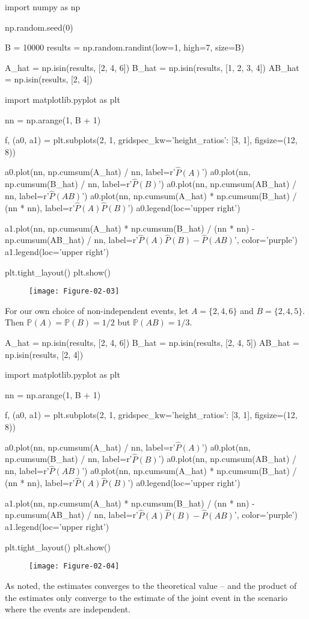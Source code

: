 \begin{python}
import numpy as np

np.random.seed(0)

B = 10000
results = np.random.randint(low=1, high=7, size=B)

A_hat = np.isin(results, [2, 4, 6])
B_hat = np.isin(results, [1, 2, 3, 4])
AB_hat = np.isin(results, [2, 4])
\end{python}

\begin{python}
import matplotlib.pyplot as plt

nn = np.arange(1, B + 1)

f, (a0, a1) = plt.subplots(2, 1, gridspec_{k}w={'height_ratios': [3, 1]}, figsize=(12, 8))

a0.plot(nn, np.cumsum(A_hat) / nn, label=r'$\hat{P}(A)$')
a0.plot(nn, np.cumsum(B_hat) / nn, label=r'$\hat{P}(B)$')
a0.plot(nn, np.cumsum(AB_hat) / nn, label=r'$\hat{P}(AB)$')
a0.plot(nn, np.cumsum(A_hat) * np.cumsum(B_hat) / (nn * nn), label=r'$\hat{P}(A) \hat{P}(B)$')
a0.legend(loc='upper right')

a1.plot(nn, np.cumsum(A_hat) * np.cumsum(B_hat) / (nn * nn) - np.cumsum(AB_hat) / nn, 
         label=r'$\hat{P}(A) \hat{P}(B)- \hat{P}(AB)$', color='purple')
a1.legend(loc='upper right')

plt.tight_layout()
plt.show()
\end{python}

\begin{figure}[H]
\centering
\texttt{[image: Figure-02-03]}
\end{figure}

For our own choice of non-independent events, let \(A = \{ 2, 4, 6\}\)
and \(B = \{2, 4, 5\}\). Then \(\mathbb{P}(A) = \mathbb{P}(B) = 1/2\)
but \(\mathbb{P}(AB) = 1/3\).

\begin{python}
A_hat = np.isin(results, [2, 4, 6])
B_hat = np.isin(results, [2, 4, 5])
AB_hat = np.isin(results, [2, 4])
\end{python}

\begin{python}
import matplotlib.pyplot as plt

nn = np.arange(1, B + 1)

f, (a0, a1) = plt.subplots(2, 1, gridspec_{k}w={'height_ratios': [3, 1]}, figsize=(12, 8))

a0.plot(nn, np.cumsum(A_hat) / nn, label=r'$\hat{P}(A)$')
a0.plot(nn, np.cumsum(B_hat) / nn, label=r'$\hat{P}(B)$')
a0.plot(nn, np.cumsum(AB_hat) / nn, label=r'$\hat{P}(AB)$')
a0.plot(nn, np.cumsum(A_hat) * np.cumsum(B_hat) / (nn * nn), label=r'$\hat{P}(A) \hat{P}(B)$')
a0.legend(loc='upper right')

a1.plot(nn, np.cumsum(A_hat) * np.cumsum(B_hat) / (nn * nn) - np.cumsum(AB_hat) / nn, 
         label=r'$\hat{P}(A) \hat{P}(B)- \hat{P}(AB)$', color='purple')
a1.legend(loc='upper right')

plt.tight_layout()
plt.show()
\end{python}

\begin{figure}[H]
\centering
\texttt{[image: Figure-02-04]}
\end{figure}

As noted, the estimates converges to the theoretical value -- and the
product of the estimates only converge to the estimate of the joint
event in the scenario where the events are independent.

